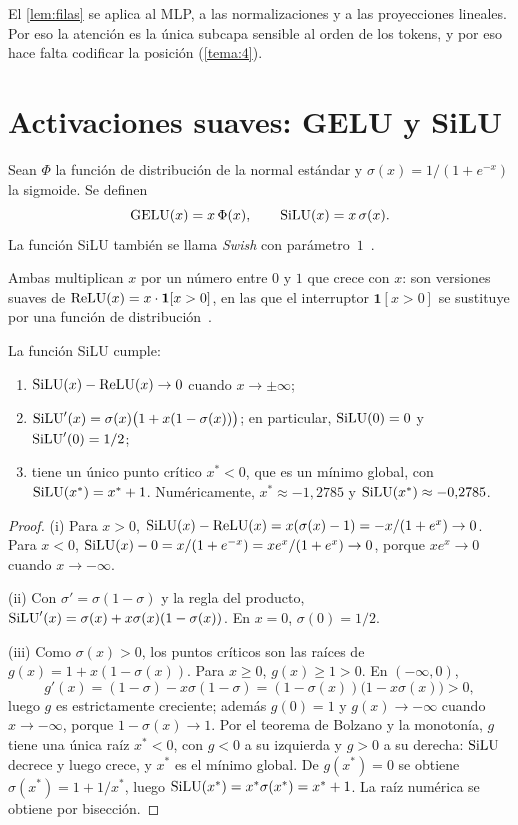 El \cref{lem:filas} se aplica al MLP, a las normalizaciones y a las proyecciones lineales. Por eso la atención es la única subcapa sensible al orden de los tokens, y por eso hace falta codificar la posición (\cref{tema:4}).

\section{Activaciones suaves: GELU y SiLU}

\begin{definicion}\label{def:gelu-silu}
Sean $\Phi$ la función de distribución de la normal estándar y $\sigma(x)=1/(1+e^{-x})$ la sigmoide. Se definen
\[
\operatorname{GELU}(x)=x\,\Phi(x),\qquad \operatorname{SiLU}(x)=x\,\sigma(x).
\]
La función SiLU también se llama \emph{Swish} con parámetro~$1$~\cite{shazeer}.
\end{definicion}

Ambas multiplican $x$ por un número entre $0$ y $1$ que crece con $x$: son versiones suaves de $\operatorname{ReLU}(x)=x\cdot\mathbf{1}[x>0]$, en las que el interruptor $\mathbf{1}[x>0]$ se sustituye por una función de distribución~\cite{gelu}.

\begin{proposicion}\label{prop:silu}
La función SiLU cumple:
\begin{enumerate}
  \item $\operatorname{SiLU}(x)-\operatorname{ReLU}(x)\to 0$ cuando $x\to\pm\infty$;
  \item $\operatorname{SiLU}'(x)=\sigma(x)\bigl(1+x(1-\sigma(x))\bigr)$; en particular, $\operatorname{SiLU}(0)=0$ y $\operatorname{SiLU}'(0)=1/2$;
  \item tiene un único punto crítico $x^{*}<0$, que es un mínimo global, con $\operatorname{SiLU}(x^{*})=x^{*}+1$. Numéricamente, $x^{*}\approx-1{,}2785$ y $\operatorname{SiLU}(x^{*})\approx-0{,}2785$.
\end{enumerate}
\end{proposicion}

\begin{proof}
(i) Para $x>0$, $\operatorname{SiLU}(x)-\operatorname{ReLU}(x)=x(\sigma(x)-1)=-x/(1+e^{x})\to 0$. Para $x<0$, $\operatorname{SiLU}(x)-0=x/(1+e^{-x})=xe^{x}/(1+e^{x})\to 0$, porque $xe^{x}\to 0$ cuando $x\to-\infty$.

(ii) Con $\sigma'=\sigma(1-\sigma)$ y la regla del producto, $\operatorname{SiLU}'(x)=\sigma(x)+x\sigma(x)(1-\sigma(x))$. En $x=0$, $\sigma(0)=1/2$.

(iii) Como $\sigma(x)>0$, los puntos críticos son las raíces de $g(x)=1+x(1-\sigma(x))$. Para $x\ge 0$, $g(x)\ge 1>0$. En $(-\infty,0)$,
\[
g'(x)=(1-\sigma)-x\sigma(1-\sigma)=(1-\sigma(x))\bigl(1-x\sigma(x)\bigr)>0,
\]
luego $g$ es estrictamente creciente; además $g(0)=1$ y $g(x)\to-\infty$ cuando $x\to-\infty$, porque $1-\sigma(x)\to 1$. Por el teorema de Bolzano y la monotonía, $g$ tiene una única raíz $x^{*}<0$, con $g<0$ a su izquierda y $g>0$ a su derecha: $\operatorname{SiLU}$ decrece y luego crece, y $x^{*}$ es el mínimo global. De $g(x^{*})=0$ se obtiene $\sigma(x^{*})=1+1/x^{*}$, luego $\operatorname{SiLU}(x^{*})=x^{*}\sigma(x^{*})=x^{*}+1$. La raíz numérica se obtiene por bisección.
\end{proof}

